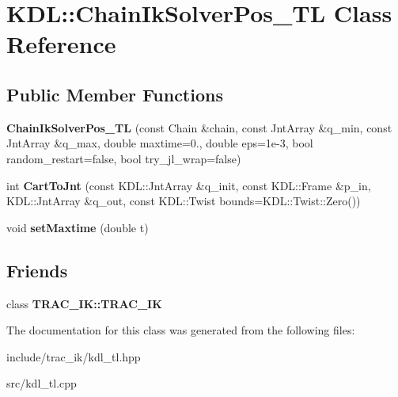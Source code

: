 \section{K\-D\-L\-:\-:Chain\-Ik\-Solver\-Pos\-\_\-\-T\-L Class Reference}
\label{class_k_d_l_1_1_chain_ik_solver_pos___t_l}
\subsection*{Public Member Functions}
\begin{DoxyCompactItemize}
\item 
{\bfseries Chain\-Ik\-Solver\-Pos\-\_\-\-T\-L} (const Chain \&chain, const Jnt\-Array \&q\-\_\-min, const Jnt\-Array \&q\-\_\-max, double maxtime=0., double eps=1e-\/3, bool random\-\_\-restart=false, bool try\-\_\-jl\-\_\-wrap=false)\label{class_k_d_l_1_1_chain_ik_solver_pos___t_l_a53a69d064e9b0e07662a343b5e9f80dd}

\item 
int {\bfseries Cart\-To\-Jnt} (const K\-D\-L\-::\-Jnt\-Array \&q\-\_\-init, const K\-D\-L\-::\-Frame \&p\-\_\-in, K\-D\-L\-::\-Jnt\-Array \&q\-\_\-out, const K\-D\-L\-::\-Twist bounds=K\-D\-L\-::\-Twist\-::\-Zero())\label{class_k_d_l_1_1_chain_ik_solver_pos___t_l_acb915f9097e22bd033f76de41d39426c}

\item 
void {\bfseries set\-Maxtime} (double t)\label{class_k_d_l_1_1_chain_ik_solver_pos___t_l_a5b6c07e49a5fa0261c29a1805b8d6f63}

\end{DoxyCompactItemize}
\subsection*{Friends}
\begin{DoxyCompactItemize}
\item 
class {\bfseries T\-R\-A\-C\-\_\-\-I\-K\-::\-T\-R\-A\-C\-\_\-\-I\-K}\label{class_k_d_l_1_1_chain_ik_solver_pos___t_l_a81945572f6a8b9dd1864f6433549689c}

\end{DoxyCompactItemize}


The documentation for this class was generated from the following files\-:\begin{DoxyCompactItemize}
\item 
include/trac\-\_\-ik/kdl\-\_\-tl.\-hpp\item 
src/kdl\-\_\-tl.\-cpp\end{DoxyCompactItemize}
